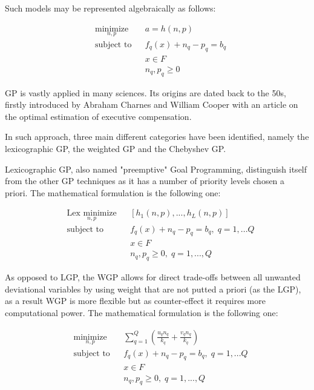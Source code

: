 \begin{doublespace}
Such models may be represented algebraically as follows:

\begin{equation*}
\begin{aligned}
& \underset{n,p}{\text{minimize}}
& & a=h(n,p) \\
& \text{subject to}
& & f_q(x)+n_q-p_q=b_q \\
& & & x\in F \\
& & & n_q,p_q\geq 0 
\end{aligned}
\end{equation*}

GP is vastly applied in many sciences\cite{Tamiz1998}. Its origins are dated back to the 50s, firstly introduced by Abraham Charnes and William Cooper\cite{Charnes1955} with an article on the optimal estimation of executive compensation.

In such approach, three main different categories have been identified, namely the lexicographic GP, the weighted GP and the Chebyshev GP.

Lexicographic GP, also named "preemptive" Goal Programming, distinguish itself from the other GP techniques as it has a number of priority levels chosen a priori. The mathematical formulation is the following one:

\begin{equation*}
\begin{aligned}
& \underset{n,p}{\text{Lex minimize}}
& & [h_1(n,p),...,h_L(n,p)] \\
& \text{subject to}
& & f_q(x)+n_q-p_q=b_q, \; q=1,...Q \\
& & & x\in F \\
& & & n_q,p_q\geq 0, \; q=1,...,Q 
\end{aligned}
\end{equation*}

As opposed to LGP, the WGP allows for direct trade-offs between all unwanted deviational variables by using weight that are not putted a priori (as the LGP), as a result WGP is more flexible but as counter-effect it requires more computational power. The mathematical formulation is the following one:

\begin{equation*}
\begin{aligned}
& \underset{n,p}{\text{minimize}}
& & \sum_{q=1}^{Q}(\frac{u_q n_q}{k_q}+\frac{v_q n_q}{k_q}) \\
& \text{subject to}
& & f_q(x)+n_q-p_q=b_q, \; q=1,...Q \\
& & & x\in F \\
& & & n_q,p_q\geq 0, \; q=1,...,Q 
\end{aligned}
\end{equation*}


\end{doublespace}

